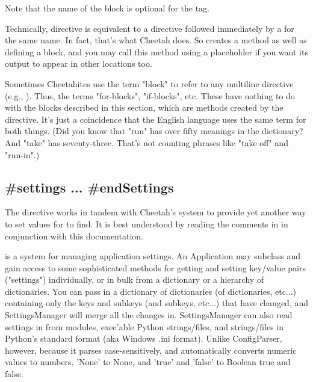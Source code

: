 Note that the name of the block is optional for the  tag.

Technically,  directive is equivalent to a  directive
followed immediately by a  for the same name.  In fact,
that's what Cheetah does.  So  creates a method as well as
defining a block, and you may call this method using a placeholder if you want
its output to appear in other locations too.

Sometimes Cheetahites use the term "block" to refer to any multiline directive
(e.g., ).  Thus, the terms "for-blocks", "if-blocks",
etc.  These have nothing to do with the blocks described in this section, which
are methods created by the  directive.  It's just a coincidence
that the English language uses the same term for both things.  (Did you know 
that "run" has over fifty meanings in the dictionary?  And "take" has
seventy-three.  That's not counting phrases like "take off" and "run-in".)


\subsection{\#settings ... \#endSettings}
\label{inheritanceEtc.settings}

The  directive works in tandem with Cheetah's
 system to provide yet another way to set values for
 to find.  It is best understood by reading the comments in
 in conjunction with this documentation.

 is a system for managing application settings.  An
Application may subclass  and gain access
to some sophisticated methods for getting and setting key/value pairs
("settings") individually, or in bulk from a dictionary or a hierarchy of
dictionaries.  You can pass in a dictionary of dictionaries (of dictionaries,
etc...) containing only the keys and subkeys (and subkeys, etc...) that have
changed, and SettingsManager will merge all the changes in.  SettingsManager can
also read settings in from modules, exec'able Python strings/files, and
strings/files in Python's standard  format (aka Windows .ini
format).  Unlike ConfigParser, however, because it parses case-sensitively, and
automatically converts numeric values to numbers, 'None' to None, and 'true' and
'false' to Boolean true and false.

